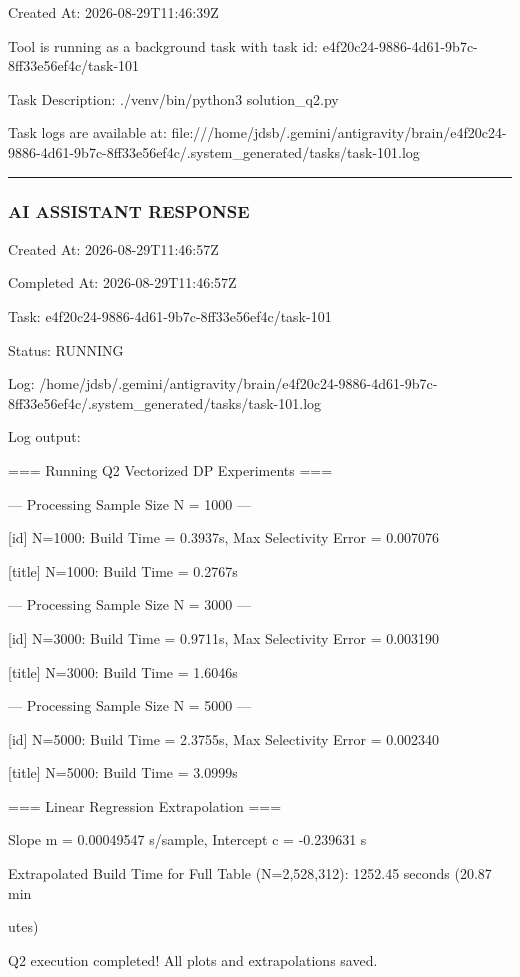 \documentclass[11pt,a4paper]{article}
\begin{document}
{Created At: 2026-08-29T11:46:39Z

Tool is running as a background task with task id: e4f20c24-9886-4d61-9b7c-8ff33e56ef4c/task-101

Task Description: ./venv/bin/python3 solution\_q2.py

Task logs are available at: file:///home/jdsb/.gemini/antigravity/brain/e4f20c24-9886-4d61-9b7c-8ff33e56ef4c/.system\_generated/tasks/task-101.log


\hrule

\subsubsection{AI ASSISTANT RESPONSE}

Created At: 2026-08-29T11:46:57Z

Completed At: 2026-08-29T11:46:57Z

Task: e4f20c24-9886-4d61-9b7c-8ff33e56ef4c/task-101

Status: RUNNING

Log: /home/jdsb/.gemini/antigravity/brain/e4f20c24-9886-4d61-9b7c-8ff33e56ef4c/.system\_generated/tasks/task-101.log

Log output:

=== Running Q2 Vectorized DP Experiments ===


--- Processing Sample Size N = 1000 ---

[id] N=1000: Build Time = 0.3937s, Max Selectivity Error = 0.007076

[title] N=1000: Build Time = 0.2767s


--- Processing Sample Size N = 3000 ---

[id] N=3000: Build Time = 0.9711s, Max Selectivity Error = 0.003190

[title] N=3000: Build Time = 1.6046s


--- Processing Sample Size N = 5000 ---

[id] N=5000: Build Time = 2.3755s, Max Selectivity Error = 0.002340

[title] N=5000: Build Time = 3.0999s

=== Linear Regression Extrapolation ===

Slope m = 0.00049547 s/sample, Intercept c = -0.239631 s

Extrapolated Build Time for Full Table (N=2,528,312): 1252.45 seconds (20.87 min

utes)

Q2 execution completed! All plots and extrapolations saved.


}
\end{document}
